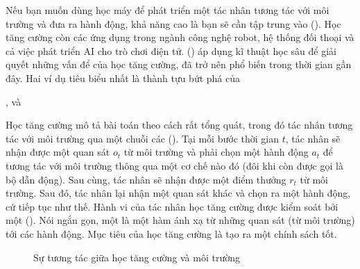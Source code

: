 \documentclass[letterpaper,11pt,english]{sphinxmanual}
\begin{document}
Nếu bạn muốn dùng học máy để phát triển một tác nhân tương tác với môi
trường và đưa ra hành động, khả năng cao là bạn sẽ cần tập trung vào
 (). Học tăng cường còn
các ứng dụng trong ngành công nghệ robot, hệ thống đối thoại và cả việc
phát triển AI cho trò chơi điện tử.  () áp dụng kĩ thuật học sâu để giải quyết
những vấn để của học tăng cường, đã trở nên phổ biến trong thời gian gần
đây. Hai ví dụ tiêu biểu nhất là thành tựu bứt phá của %
\begin{footnote}[35]\sphinxAtStartFootnote
{}
%
\end{footnote},
và %
\begin{footnote}[36]\sphinxAtStartFootnote
{}
%
\end{footnote}



Học tăng cường mô tả bài toán theo cách rất tổng quát, trong đó tác nhân
tương tác với môi trường qua một chuỗi các 
(). Tại mỗi bước thời gian \(t\), tác nhân sẽ nhận được
một quan sát \(o_t\) từ môi trường và phải chọn một hành động
\(a_t\) để tương tác với môi trường thông qua một cơ chế nào đó (đôi
khi còn được gọi là bộ dẫn động). Sau cùng, tác nhân sẽ nhận được một
điểm thưởng \(r_t\) từ môi trường. Sau đó, tác nhân lại nhận một
quan sát khác và chọn ra một hành động, cứ tiếp tục như thế. Hành vi của
tác nhân học tăng cường được kiểm soát bởi một  ().
Nói ngắn gọn, một  là một hàm ánh xạ từ những quan sát (từ
môi trường) tới các hành động. Mục tiêu của học tăng cường là tạo ra một
chính sách tốt.



\begin{figure}[H]
\centering
\capstart

\noindent{}
\caption{Sự tương tác giữa học tăng cường và môi trường}\label{\detokenize{chapter_introduction/index_vn:id17}}\label{\detokenize{chapter_introduction/index_vn:dich-tieu-de-phia-tren-2}}\label{\detokenize{chapter_introduction/index_vn:dich-tieu-de-phia-tren-1}}\end{figure}
\end{document}
